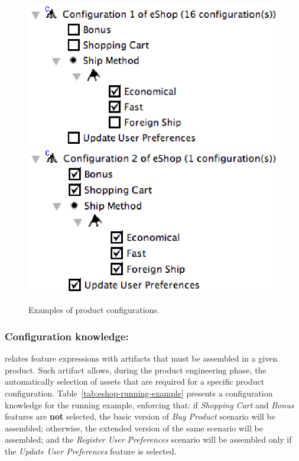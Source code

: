 \begin{figure}[h]
  \centerline{
    \mbox{\includegraphics[scale=0.5]{img/pc-01.eps}}
    \mbox{\includegraphics[scale=0.5]{img/pc-02.eps}}
  }
  \caption{Examples of product configurations.}
  \label{fig:product-config-01-02}
  \end{figure}

\subsubsection{Configuration knowledge:}

relates feature expressions with artifacts that must be assembled in a given
product. Such artifact allows, during the product engineering phase, the automatically selection of assets that are 
required for a specific product configuration. Table~\ref{tab:eshop-running-example} presents a configuration knowledge 
for the running example, enforcing that: if \emph{Shopping Cart} and \emph{Bonus} features are {\bf not} selected, the 
basic version of \emph{Buy Product} scenario will be assembled; otherwise, the extended version of the same 
scenario will be assembled; and the \emph{Register User Preferences} scenario will be assembled only if the \emph{Update 
User Preferences} feature is selected.


